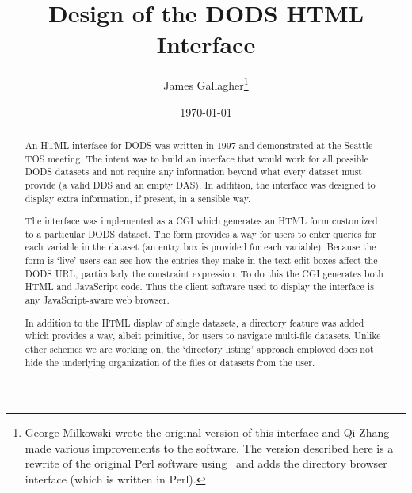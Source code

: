 \documentclass{article}
\begin{document}
\title{Design of the DODS HTML Interface} 

\author{James Gallagher\thanks{George Milkowski wrote the original version of
    this interface and Qi Zhang made various improvements to the software.
    The version described here is a rewrite of the original Perl software
    using \Cpp\ and adds the directory browser interface (which is written in
    Perl).}}

\date{\today}

\maketitle

\begin{htmlonly}
\end{htmlonly}

\begin{abstract}
  
  An HTML interface for DODS was written in 1997 and demonstrated at the
  Seattle TOS meeting.  The intent was to build an interface that would work
  for all possible DODS datasets and not require any information beyond what
  every dataset must provide (a valid DDS and an empty DAS). In addition, the
  interface was designed to display extra information, if present, in a
  sensible way. 
  
  The interface was implemented as a CGI which generates an HTML form
  customized to a particular DODS dataset. The form provides a way for users
  to enter queries for each variable in the dataset (an entry box is provided
  for each variable). Because the form is `live' users can see how the
  entries they make in the text edit boxes affect the DODS URL, particularly
  the constraint expression. To do this the CGI generates both HTML and
  JavaScript code. Thus the client software used to display the interface is
  any JavaScript-aware web browser.

  In addition to the HTML display of single datasets, a directory feature was
  added which provides a way, albeit primitive, for users to navigate
  multi-file datasets. Unlike other schemes we are working on, the `directory
  listing' approach employed does not hide the underlying organization of the
  files or datasets from the user.

\end{abstract}

\tableofcontents

\pagebreak
\end{document}
